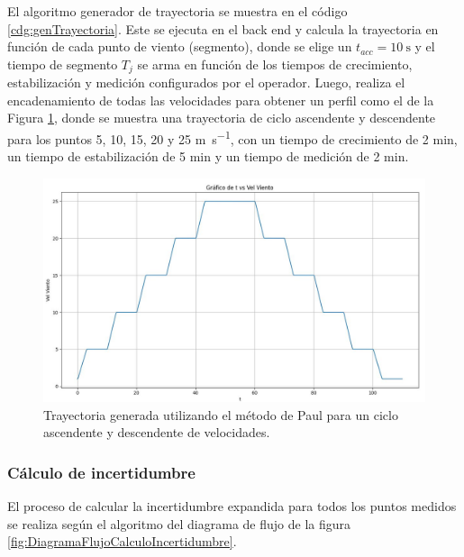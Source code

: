 El algoritmo generador de trayectoria se muestra en el código \ref{cdg:genTrayectoria}. Este se ejecuta en el back end y calcula la trayectoria en función de cada punto de viento (segmento), donde se elige un $t_{acc} = \SI{10}{\second}$ y el tiempo de segmento $T_{j}$ se arma en función de los tiempos de crecimiento, estabilización y medición configurados por el operador. Luego, realiza el encadenamiento de todas las velocidades para obtener un perfil como el de la Figura \ref{fig:trayectoriaGenerada}, donde se muestra una trayectoria de ciclo ascendente y descendente para los puntos 5, 10, 15, 20 y 25 \unit{\meter\per\second}, con un tiempo de crecimiento de 2 \unit{\minute}, un tiempo de estabilización de 5 \unit{\minute} y un tiempo de medición de 2 \unit{\minute}.

\begin{figure}[H]
    \centering
    \includegraphics[width=0.7\linewidth]{Figuras/AplicacionWeb/backend/trayectoriaGenerada.jpg}
    \caption{Trayectoria generada utilizando el método de Paul para un ciclo ascendente y descendente de velocidades.}
    \label{fig:trayectoriaGenerada}
\end{figure}
\subsubsection{Cálculo de incertidumbre}\label{sec:calculoIncertidumbre}

El proceso de calcular la incertidumbre expandida para todos los puntos medidos se realiza según el algoritmo del diagrama de flujo de la figura \ref{fig:DiagramaFlujoCalculoIncertidumbre}.

